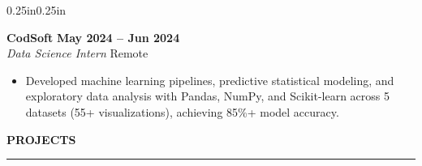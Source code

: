 \documentclass[11pt,a4paper]{article}
\newcommand{\cvsection}[1]{%
    \vspace{10pt}
    \noindent\textbf{\large\MakeUppercase{#1}}
    \vspace{3pt}
    \hrule
    \vspace{5pt}
}
\newcommand{\expheader}[4]{%
    \noindent\textbf{#1} \hfill \textbf{#2} \\
    \textit{#3} \hfill #4
}
\begin{document}
\begin{adjustwidth}{0.25in}{0.25in}
\vspace{8pt}

\expheader{CodSoft}{May 2024 -- Jun 2024}{Data Science Intern}{Remote}
\vspace{2pt}
\begin{itemize}[leftmargin=0.2in, itemsep=1pt, parsep=0pt, topsep=0pt]
\item Developed machine learning pipelines, predictive statistical modeling, and exploratory data analysis with Pandas, NumPy, and Scikit-learn across 5 datasets (55+ visualizations), achieving 85\%+ model accuracy.
\end{itemize}

\end{adjustwidth}

\cvsection{Projects}
\end{document}
